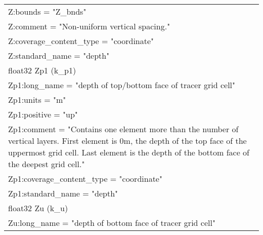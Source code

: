\begin{longtable}{|p{\textwidth}|}
\rowcolor{Apricot}\hspace{0.5cm}\hspace{0.5cm}Z:bounds = "Z\_bnds"\\
\rowcolor{Apricot}\hspace{0.5cm}\hspace{0.5cm}Z:comment = "Non-uniform vertical spacing."\\
\rowcolor{Apricot}\hspace{0.5cm}\hspace{0.5cm}Z:coverage\_content\_type = "coordinate"\\
\rowcolor{Apricot}\hspace{0.5cm}\hspace{0.5cm}Z:standard\_name = "depth"\\
\rowcolor{Apricot}\hspace{0.5cm}float32 Zp1 (k\_p1)\\
\rowcolor{Apricot}\hspace{0.5cm}\hspace{0.5cm}Zp1:long\_name = "depth of top/bottom face of tracer grid cell"\\
\rowcolor{Apricot}\hspace{0.5cm}\hspace{0.5cm}Zp1:units = "m"\\
\rowcolor{Apricot}\hspace{0.5cm}\hspace{0.5cm}Zp1:positive = "up"\\
\rowcolor{Apricot}\hspace{0.5cm}\hspace{0.5cm}Zp1:comment = "Contains one element more than the number of vertical layers. First element is 0m, the depth of the top face of the uppermost grid cell. Last element is the depth of the bottom face of the deepest grid cell."\\
\rowcolor{Apricot}\hspace{0.5cm}\hspace{0.5cm}Zp1:coverage\_content\_type = "coordinate"\\
\rowcolor{Apricot}\hspace{0.5cm}\hspace{0.5cm}Zp1:standard\_name = "depth"\\
\rowcolor{Apricot}\hspace{0.5cm}float32 Zu (k\_u)\\
\rowcolor{Apricot}\hspace{0.5cm}\hspace{0.5cm}Zu:long\_name = "depth of bottom face of tracer grid cell"\\

\end{longtable}
